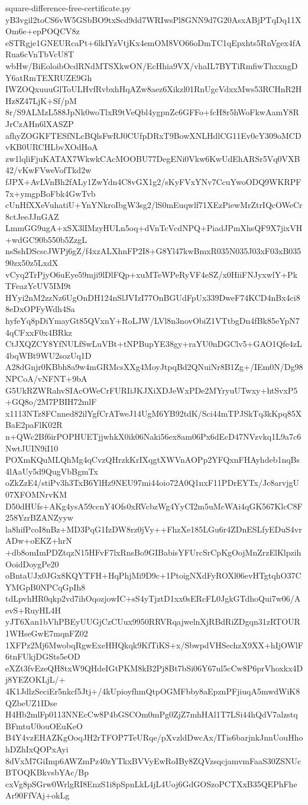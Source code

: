 \documentclass[11pt]{article}
\theoremstyle{definition}
\theoremstyle{remark}
\begin{document}
\begin{filecontents*}[overwrite]{square-difference-free-certificate.py}
yB3vgil2toCS6vW5GSbBO9txScd9dd7WRIwsPl8GNN9d7G20AsxABjPTqDq11XOm6e+epPOQCV8z
eSTRgje1GNEURcaPt+6lkIYzVtjKx4emOM8VO66oDmTC1qEpxhts5RnVgex4fARua6cVnTbVcU8T
wbHw/BiEoloibOcdRNdMTSXkwON/EcHhia9VX/vhaIL7BYTiRmfiwThxxngDY6atRmTEXRUZE9Gh
IWZOQxuuuGlToULHvfRvbxhHqAZw8aez6Xikzl01RnUgcVdxxMws53RCHnR2HHz8Z47LjK+Sf/pM
8r/S9ALMzL588JpNk0woTlxR9tVeQbl4ygpnZc6GFFo+fcH8r5hWoFkwAamY8RJrCzAHn6lXASZP
afhyZOGKFTESfNLcBQlsFwRJ0CUfpDRxT9BowXNLHdlCG11Ev0cY309oMCDvKB0URCHLbvXOdHoA
zw1lqliFjuKATAX7WkwkCAcMOOBU77DegENi0Vkw6KwUdEhARSr5Vq0VXB42/vKwFVweVofTkd2w
fJPX+AvLVnBh2fALy1ZwYdn4C8vGX1g2/sKyFVxYNv7CcuYwoODQ9WKRPF7x+ymgpBoFbk4GwTvb
cUnHfXXeVuhatiU+YnYNkroIbgW3sg2/lS0mEuqwlf71XEzPiewMrZtrIQcOWeCr8ctJeeJJnGAZ
LmmGG9ugA+xSX3lIMzyHULn5oq+dVnTcVcdNPQ+PiadJPmXhsQF9X7jixVH+wdGC90b550b5ZzgL
nsSshDScscJWPj6gZ/f4xzALXhnFP2I8+G8Yl47kwBmxR035N035J03xF03xB03590zx50z5LxdX
vCyq2TrPjyO6uEye59mji9lDlFQp+xuMTeWPeRyVF4eSZ/x0HiiFNJyxwlY+PkTFeazYcUV5IM9t
HYyi2nM2zzNz6UgOnDH124nSlJVIzI77OnBGUdFpUx339DweF74KCD4nBx4ci88eDxOPFyWdh4Sa
hyfeYq8pDiYmayGt85QVxnY+RoLJW/LVl8n3novObiZ1VTtbgDn4fBk85eYpN74qCFxxF0x4BRkz
CtJXQZCY8YfNULfSwLuVBt+tNPBupYE38gy+raYU0nDGClv5+GAO1Qfe4zL4bqWBt9WU2sozUq1D
A28dGnjr0KBbh8a9w4mGRMcsXXg4MoyJtpqBd2QNuiNr8B1Zg+/IEm0N/Dg98NPCoA/vNFNT+9bA
G5UkRZWRahvSIAcOWeCrFURIiJKJXiXDJeWxPDe2MYryuUTwxy+htSvxP5+GQ8o/2M7PBIH72mlF
x1113NTz8FCnned82ilYgfCrATweJ14UgM6YB92tdK/Sci44mTPJSkTq3kKpq85XBaE2paFlK02R
n+QWc2Bf6irPOPHUETjjwhkX0ik06Naki56ex8am06Px6dEcD47NVzvkq1L9a7c6NwtJUIN9iI10
POXmKQuMLQhMg4qCvzQHrzkKrIXqgtXWVnAOPp2YFQxnFHAyhdeb1nqBs4lAaUy5d9QugVbBgmTx
oZkZzE4/stiPv3h3TxB6YlHz9NEU97mi44oio72A0Q1nxF11PDrEYTx/Jc8arvjgU07XFOMNrvKM
D50dHUfs+AKg4ysA59ccnY4Ofs0xRVcbzWg4YyCI2m5uMcWAi4qGK567KlcC8F258YzrBZANZyyw
la8hifPcoI8nBz+MD3PqG1IzDW8rz0jVy++FhzXe185LGu6r4ZDnESLfyEDuS4vrADw+oEKZ+hrN
+db8omImPDZtqzN15HFvF7lxRnsBo9GIBabisYFUrcSrCpKgOojMnZrzElKlpzihOoidDoygPe20
oBntaUJx0JGx8KQYTFH+HqPhjMi9D9c+1PtoigNXdFyROXl06evHTgtqhO37CYMGpB0NPCqGpIh8
tdLpvhHR0qkp2vd7ihOqozjowIC+sS4yTjztD1xx0sERcFL0JgkGTdhoQui7w06/AevS+RuyHL4H
yJT6Xan1bVhPBEyUUGjCzCUux9950RRVRqajwelnXjRBdRiZDgqn31zRTOUR1WHseGwE7mqnFZ02
1XFPz2Mj6MwobqRgwExeHHQkqk9KfTiKS+x/SbwpdVHSechzX9XX+hIjOWlF6tnFUkjDGSts5eOD
eXZt3fvEzeQH8txW9QHdeIGtPKM8kB2Pj8Bt7bSi06Y67ul5cCw8P6prVhoxkx4Dj8YEZOKLjL/+
4K1JdlzSeciEr5nkcf5Jtj+/4kUpioyfhmQtpOGMFbby8aEpznPFjiuqA5mwdWiK8QZbeUZ1IDse
H4Hb2mlFp0113NNEcCw8P4bGSCOm0mPg0ZjZ7mhHAl1T7LSi44hQdV7alzstqBFmtuU0ouOEuKeO
B4Y4vzEHAZKgOoqJH2rTFOP7TeURqe/pXvzldDwcAx/ITis6barjnkJnnUouHhohDZhIxQOPxAyi
8dVxM7GiImp6AWZmPz40zYTkxBVVyEwRoIBy8ZQVzsqcjamvmFaaS30ZSNUcBTOQKBkvsbYAc/Bp
cxVg8pSGrw0WrlgRI8EnzS1i8pSpnLkL4jL4Uoj6GdGOSzoPCTXxB35QEPhFheAr90FfVAj+okLg

\end{filecontents*}
\end{document}
